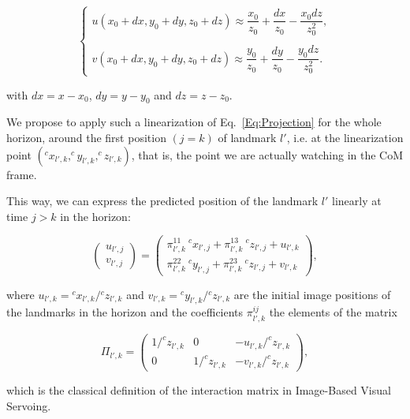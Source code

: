 $$
\left\{
\begin{array}{c}
\nonumber
 u(x_0+dx,y_0+dy,z_0+dz) \approx \dfrac{x_0}{z_0} +  \dfrac{dx}{z_0} - \dfrac{x_0 dz}{z_0^2},\\ \\
 v(x_0+dx,y_0+dy,z_0+dz) \approx \dfrac{y_0}{z_0} +  \dfrac{dy}{z_0} - \dfrac{y_0 dz}{z_0^2}.
\end{array}
\right.
$$

\noindent with $dx=x-x_0$, $dy=y-y_0$ and $dz=z-z_0$. 

We propose to apply such a linearization of Eq.~\ref{Eq:Projection} for the whole horizon, around the first position $(j=k)$ of landmark $l'$, i.e. at the linearization point $(^{c}x_{l',k},^{c}y_{l',k},^{c}z_{l',k})$, that is, the point we are actually watching in the CoM frame. 

This way, we can express the predicted position of the landmark $l'$ linearly at time $j>k$ in the horizon:

\begin{equation*}
 \left(
 \begin{matrix}
  u_{l',j} \\
  v_{l',j}
 \end{matrix}
 \right)
 = \left(
 \begin{matrix}
  \pi^{11}_{l',k} \ ^{c}x_{l',j} + \pi^{13}_{l',k} \ ^{c}z_{l',j}+ u_{l',k}\\
  \pi^{22}_{l',k} \ ^{c}y_{l',j} + \pi^{23}_{l',k} \ ^{c}z_{l',j} + v_{l',k}
 \end{matrix}
 \right),
\end{equation*}

\noindent where $u_{l',k} = {^cx_{l',k}} / {^cz_{l',k}}$ and $v_{l',k} = {^cy_{l',k}} / {^cz_{l',k}}$ are the initial image positions of the landmarks in the horizon and the coefficients $\pi^{ij}_{l',k}$ the elements of the matrix

\begin{equation*}
\Pi_{l',k} = \left(
\begin{matrix}
 1/^{c}z_{l',k} & 0 & - u_{l',k} / ^{c}z_{l',k} \\
 0 & 1/^{c}z_{l',k} & - v_{l',k} / ^{c}z_{l',k}
\end{matrix}
\right),
\end{equation*}

\noindent which is the classical definition of the interaction matrix in Image-Based Visual Servoing.

